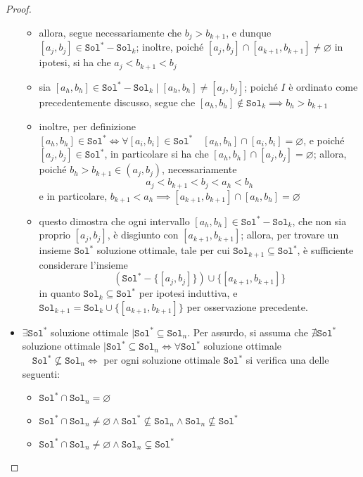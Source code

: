 \documentclass[a4paper, 12pt]{report}
\begin{document}
\begin{proof}
\begin{itemize}
\begin{itemize}
                    \item allora, segue necessariamente che $b_j > b_{k + 1}$, e dunque $[a_j, b_j] \in \texttt{Sol}^* - \texttt{Sol}_k$; inoltre, poiché $[a_j, b_j] \cap [a_{k +1} , b_{k +1}] \neq \varnothing$ in ipotesi, si ha che $a_j < b_{k +1} < b_j$
                    \item sia $[a_h, b_h] \in \texttt{Sol}^* - \texttt{Sol}_k \mid [a_h, b_h] \neq [a_j, b_j]$; poiché $I$ è ordinato come precedentemente discusso, segue che $[a_h, b_h] \notin \texttt{Sol}_k \implies b_h > b_{k +1}$
                    \item inoltre, per definizione $[a_h, b_h] \in \texttt{Sol}^* \iff \forall [a_i, b_i] \in \texttt{Sol}^* \quad [a_h, b_h] \cap [a_i, b_i] = \varnothing$, e poiché $[a_j,b_j] \in \texttt{Sol}^*$, in particolare si ha che $[a_h, b_h] \cap [a_j, b_j] = \varnothing$; allora, poiché $b_h > b_{k + 1} \in (a_j, b_j)$, necessariamente $$a_j < b_{k +1} < b_j < a_h < b_h$$ e in particolare, $b_{k + 1} < a_h \implies [a_{k +1}, b_{k +1}] \cap [a_h, b_h] = \varnothing$
                    \item questo dimostra che ogni intervallo $[a_h, b_h] \in \texttt{Sol}^* - \texttt{Sol}_k$, che non sia proprio $[a_j, b_j]$, è disgiunto con $[a_{k +1}, b_{k +1}]$; allora, per trovare un insieme $\texttt{Sol}^*$ soluzione ottimale, tale per cui $\texttt{Sol}_{k + 1} \subseteq \texttt{Sol}^*$, è sufficiente considerare l'insieme $$\left(\texttt{Sol}^* - \{[a_j, b_j]\}\right) \cup \{[a_{k +1}, b_{k +1}]\}$$ in quanto $\texttt{Sol}_k \subseteq \texttt{Sol}^*$ per ipotesi induttiva, e $\texttt{Sol}_{k + 1} = \texttt{Sol}_k \cup \{[a_{k +1}, b_{k + 1}]\}$ per osservazione precedente.
                \end{itemize}
                \item[]  $\exists \texttt{Sol}^*$ soluzione ottimale $\mid \texttt{Sol}^* \subseteq \texttt{Sol}_n$. Per assurdo, si assuma che $\nexists \texttt{Sol}^*$ soluzione ottimale $\mid \texttt{Sol}^* \subseteq \texttt{Sol}_n \iff \forall \texttt{Sol}^*$ soluzione ottimale $\quad \texttt{Sol}^* \not \subseteq \texttt{Sol}_n \iff$ per ogni soluzione ottimale $\texttt{Sol}^*$ si verifica una delle seguenti:
                \begin{itemize}
                    \item $\texttt{Sol}^* \cap \texttt{Sol}_n = \varnothing$
                    \item $\texttt{Sol}^* \cap \texttt{Sol}_n \neq \varnothing \land \texttt{Sol}^* \not \subseteq \texttt{Sol}_n \land \texttt{Sol}_n \not \subseteq \texttt{Sol}^*$
                    \item $\texttt{Sol}^* \cap \texttt{Sol}_n \neq \varnothing \land \texttt{Sol}_n \subsetneq \texttt{Sol}^*$
                \end{itemize}


\end{itemize}
\end{proof}
\end{document}
